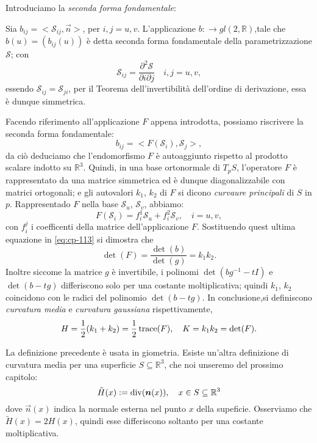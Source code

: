 Introduciamo la \emph{seconda forma fondamentale}:
\begin{definizione}
Sia $b_{ij}=<\mathcal{S}_{ij},\vec{n}>$, per $i,j=u,v$. L'applicazione $b:\longrightarrow gl(2,\mathbb{R})$,tale che $b(u)=(b_{ij}(u))$ è detta seconda forma fondamentale della parametrizzazione $\mathcal{S}$; con
\[
\mathcal{S}_{ij}=\frac{\partial^2\mathcal{S}}{\partial i\partial j}\quad i,j = u,v,
\]
essendo $\mathcal{S}_{ij}=\mathcal{S}_{ji}$, per il Teorema dell'invertibilità dell'ordine di derivazione, essa è dunque simmetrica.
\end{definizione}
Facendo riferimento all'applicazione $F$ appena introdotta, possiamo riscrivere la seconda forma fondamentale:
\begin{equation}
\label{eq:cp-113}
b_{ij}=<F(\mathcal{S}_i),\mathcal{S}_j>,
\end{equation}
da ciò deduciamo che l'endomorfismo $F$ è autoaggiunto rispetto al prodotto scalare indotto su $\mathbb{R}^3$. Quindi, in una base ortonormale di $T_pS$, l'operatore $F$ è rappresentato da una matrice simmetrica ed è dunque diagonalizzabile con matrici ortogonali; e gli autovalori $k_1$, $k_2$ di $F$ si dicono \emph{curvaure principali} di $S$ in $p$. Rappresentado $F$ nella base $\mathcal{S}_u$, $\mathcal{S}_v$, abbiamo:
\[
F(\mathcal{S}_i) = f_i^1\mathcal{S}_u + f_i^2\mathcal{S}_v,\quad i=u,v,
\]
con $f_i^j$ i coefficenti della matrice dell'applicazione $F$. Sostituendo quest ultima equazione in \eqref{eq:cp-113} si dimostra che
\[
\det(F) = \frac{\det(b)}{\det(g)}=k_1k_2.
\]
Inoltre siccome la matrice $g$ è invertibile, i polinomi $\det(bg^{-1}-tI)$ e $\det(b-tg)$ differiscono solo per una costante moltiplicativa; quindi $k_1$, $k_2$ coincidono con le radici del polinomio $\det(b-tg)$.
In conclusione,si definiscono \emph{curvatura media} e \emph{curvatura gaussiana} rispettivamente,
\[
H=\frac{1}{2}(k_1+k_2)=\frac{1}{2}\operatorname{trace}(F),\quad K=k_1k_2=\det(F).
\]
\begin{osservazione}
La definizione precedente è usata in giometria. Esiste un'altra definizione di curvatura media per una superficie $S\subseteq\mathbb{R}^3$, che noi unseremo del prossimo capitolo:
\[
\tilde{H}(x):= \operatorname{div}(\bm{n}(x)), \quad x\in S\subseteq\mathbb{R}^3
\]
dove $\vec{n}(x)$ indica la normale esterna nel punto $x$ della supeficie.
Osserviamo che $\tilde{H}(x)=2H(x)$, quindi esse differiscono soltanto per una costante moltiplicativa.
\end{osservazione}
%
%
